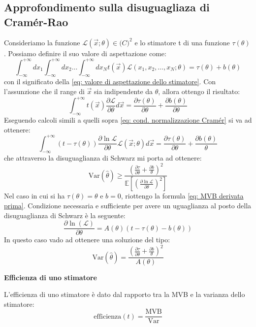 \documentclass[openany,a4paper,12pt]{book}
\providecommand{\mathscr}[1]{\mathcal{#1}}
\theoremstyle{remark}
\begin{document}
\subsection*{Approfondimento sulla disuguagliaza di Cramér-Rao}
Consideriamo la funzione $\mathscr{L}(\vec{x}; \theta) \in {\mathbb(C)}^2$ e lo stimatore t di una funzione $\tau(\theta)$. Possiamo definire il suo valore di aspettazione come:
\begin{equation}
    \int_{-\infty}^{+\infty} dx_1 \int_{-\infty}^{+\infty} dx_2 \dots \int_{-\infty}^{+\infty} dx_N t(\vec{x}) \mathscr{L}(x_1, x_2, \dots, x_N; \theta) = \tau(\theta) + b(\theta)
\end{equation}
con il significato della \eqref{eq: valore di aspettazione dello stimatore}.
Con l'assunzione che il range di $\vec{x}$ sia indipendente da $\theta$, allora ottengo il risultato:
\begin{equation}
    \int_{-\infty}^{+\infty} t(\vec{x}) \frac{\partial \mathscr{L}}{\partial \theta} d\vec{x} = \frac{\partial \tau(\theta)}{\partial \theta} + \frac{\partial b(\theta)}{\partial \theta}
\end{equation}
Eseguendo calcoli simili a quelli sopra \eqref{eq: cond. normalizzazione Cramér} si va ad ottenere:
\begin{equation}
    \int_{-\infty}^{+\infty} (t - \tau(\theta)) \frac{\partial \ln \mathscr{L}}{\partial \theta} \mathscr{L}(\vec{x}; \theta) d\vec{x} = \frac{\partial \tau(\theta)}{\partial \theta} + \frac{\partial b(\theta)}{\theta}
\end{equation}
che attraverso la disuguaglianza di Schwarz mi porta ad ottenere:
\begin{equation}
    \mathrm{Var}(\hat{\theta}) \geq \frac{{(\frac{\partial \tau}{\partial \theta} + \frac{\partial b}{\theta})}^2}{\mathbb{E}\left[ \left( \frac{\partial \ln \mathscr{L}}{\partial \theta} \right)^2 \right]}
\end{equation}
Nel caso in cui si ha $\tau(\theta)= \theta$ e $b=0$, riottengo la formula \eqref{eq: MVB derivata prima}. Condizione necessaria e sufficiente per avere un uguaglianza al posto della disuguaglianza di Schwarz è la seguente:
\begin{equation}
    \frac{\partial \ln(\mathscr{L})}{\partial \theta} = A(\theta) (t - \tau(\theta) - b(\theta))
\end{equation}
In questo caso vado ad ottenere una soluzione del tipo:
\begin{equation}
    \mathrm{Var}(\hat{\theta}) = \frac{{(\frac{\partial \tau}{\partial \theta} + \frac{\partial b}{\theta})}^2}{A(\theta)}
\end{equation}
\begin{definizione}{\textbf{Efficienza di uno stimatore}}

    L'efficienza di uno stimatore è dato dal rapporto tra la MVB e la varianza dello stimatore:
    \begin{equation*}
        \text{efficienza}(t)= \frac{\mathrm{MVB}}{\mathrm{Var}}
    \end{equation*}
\end{definizione}
\end{document}
